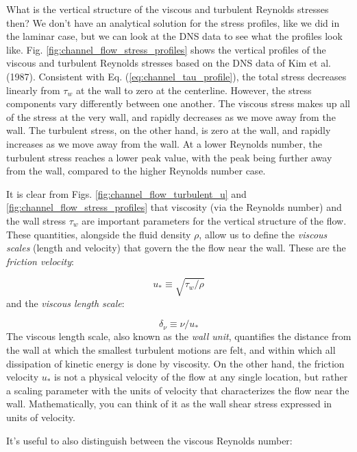 \documentclass[12pt]{article}
\numberwithin{equation}{section}
\numberwithin{figure}{section}
\numberwithin{table}{section}
\begin{document}
What is the vertical structure of the viscous and turbulent Reynolds stresses
then?
We don't have an analytical solution for the stress profiles, like we did in the
laminar case, but we can look at the DNS data to see what the profiles look like.
Fig. \ref{fig:channel_flow_stress_profiles} shows the vertical profiles of the
viscous and turbulent Reynolds stresses based on the DNS data of Kim et al.
(1987).
Consistent with Eq. (\ref{eq:channel_tau_profile}), the total stress decreases
linearly from $\tau_w$ at the wall to zero at the centerline.
However, the stress components vary differently between one another.
The viscous stress makes up all of the stress at the very wall, and rapidly
decreases as we move away from the wall.
The turbulent stress, on the other hand, is zero at the wall, and rapidly
increases as we move away from the wall.
At a lower Reynolds number, the turbulent stress reaches a lower peak value,
with the peak being further away from the wall, compared to the higher
Reynolds number case.

It is clear from Figs. \ref{fig:channel_flow_turbulent_u} and
\ref{fig:channel_flow_stress_profiles} that viscosity (via the Reynolds number)
and the wall stress $\tau_w$ are important parameters for the vertical structure
of the flow.
These quantities, alongside the fluid density $\rho$, allow us to define the
\textit{viscous scales} (length and velocity) that govern the the flow near the
wall.
These are the \textit{friction velocity}:

\begin{equation}
  u_* \equiv \sqrt{\tau_w/\rho}
\end{equation}
and the \textit{viscous length scale}:

\begin{equation}
  \delta_\nu \equiv \nu/u_*
\end{equation}
The viscous length scale, also known as the \textit{wall unit}, quantifies the
distance from the wall at which the smallest turbulent motions are felt, and
within which all dissipation of kinetic energy is done by viscosity.
On the other hand, the friction velocity $u_*$ is not a physical velocity of the
flow at any single location, but rather a scaling parameter with the units of
velocity that characterizes the flow near the wall.
Mathematically, you can think of it as the wall shear stress expressed in units
of velocity.

It's useful to also distinguish between the viscous Reynolds number:
\end{document}
